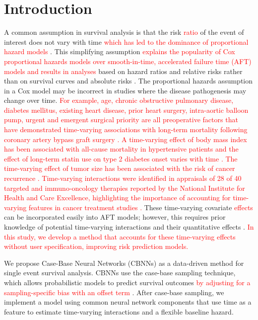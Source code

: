 \documentclass[preprint,12pt,authoryear]{elsarticle}
\begin{document}
\hypertarget{introduction}{%
\section{Introduction}\label{introduction}}

A common assumption in survival analysis is that the risk \textcolor{red}{ratio} of the event of interest does not vary with time \textcolor{red}{which has led to the dominance of proportional hazard models\citep{cox1972regression}} \citep{hanley2009}. This simplifying assumption \textcolor{red}{explains the popularity of Cox proportional hazards models over smooth-in-time, accelerated failure time (AFT) models and results in analyses} based on hazard ratios and relative risks rather than on survival curves and absolute risks \citep{hanley2009}. The proportional hazards assumption in a Cox model may be incorrect in studies where the disease pathogenesis may change over time. \textcolor{red}{For example, age, chronic obstructive pulmonary disease, diabetes mellitus, existing heart disease, prior heart surgery, intra-aortic balloon pump, urgent and emergent surgical priority are all preoperative factors that have demonstrated time-varying associations with long-term mortality following coronary artery bypass graft surgery \citep{gao2006time}. A time-varying effect of body mass index has been associated with all-cause mortality in hypertensive patients \citep{zhu2022time} and the effect of long-term statin use on type 2 diabetes onset varies with time \citep{na2020time}. The time-varying effect of tumor size has been associated with the risk of cancer recurrence \citep{coradini2000time}. Time-varying interactions were identified in appraisals of 28 of 40 targeted and immuno-oncology therapies reported by the National Institute for Health and Care Excellence, highlighting the importance of accounting for time-varying features in cancer treatment studies \citep{salmon2023clinical}.} These time-varying covariate \textcolor{red}{effects} can be incorporated easily into AFT models; however, this requires prior knowledge of potential time-varying interactions and their quantitative effects \citep{royston2002flexible}. \textcolor{red}{In this study, we develop a method that accounts for these time-varying effects without user specification, improving risk prediction models.}

We propose Case-Base Neural Networks (CBNNs) as a data-driven method for single event survival analysis. CBNNs use the case-base sampling technique, which allows probabilistic models to predict survival outcomes \textcolor{red}{by adjusting for a sampling-specific bias with an offset term} \citep{hanley2009}. After case-base sampling, we implement a model using common neural network components that use time as a feature to estimate time-varying interactions and a flexible baseline hazard.
\end{document}
